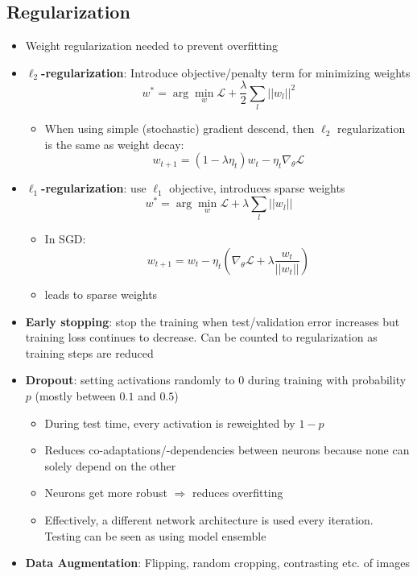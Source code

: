 \subsection{Regularization}
\begin{itemize}
	\item Weight regularization needed to prevent overfitting
	\item \textbf{$\ell_2$-regularization}: Introduce objective/penalty term for minimizing weights
	$$w^{*}=\arg\min_w \mathcal{L} + \frac{\lambda}{2}\sum_l ||w_l||^2$$
	\begin{itemize}
		\item When using simple (stochastic) gradient descend, then $\ell_2$ regularization is the same as weight decay: $$w_{t+1} = \left(1-\lambda \eta_t\right) w_{t} - \eta_t \nabla_{\theta} \mathcal{L}$$
	\end{itemize}
	\item \textbf{$\ell_1$-regularization}: use $\ell_1$ objective, introduces sparse weights
	$$w^{*}=\arg\min_w \mathcal{L} + \lambda \sum_l ||w_l||$$
	\begin{itemize}
		\item In SGD: $$ w_{t+1} = w_t - \eta_t \left( \nabla_\theta \mathcal{L} + \lambda \dfrac{w_t}{||w_t||} \right) $$
		\item leads to sparse weights
	\end{itemize}
	\item \textbf{Early stopping}: stop the training when test/validation error increases but training loss continues to decrease. Can be counted to regularization as training steps are reduced
	\item \textbf{Dropout}: setting activations randomly to 0 during training with probability $p$ (mostly between $0.1$ and $0.5$)
	\begin{itemize}
		\item During test time, every activation is reweighted by $1 - p$
		\item Reduces co-adaptations/-dependencies between neurons because none can solely depend on the other
		\item Neurons get more robust $\Rightarrow$ reduces overfitting
		\item Effectively, a different network architecture is used every iteration. Testing can be seen as using model ensemble
	\end{itemize}
	\item \textbf{Data Augmentation}: Flipping, random cropping, contrasting etc. of images
\end{itemize}
